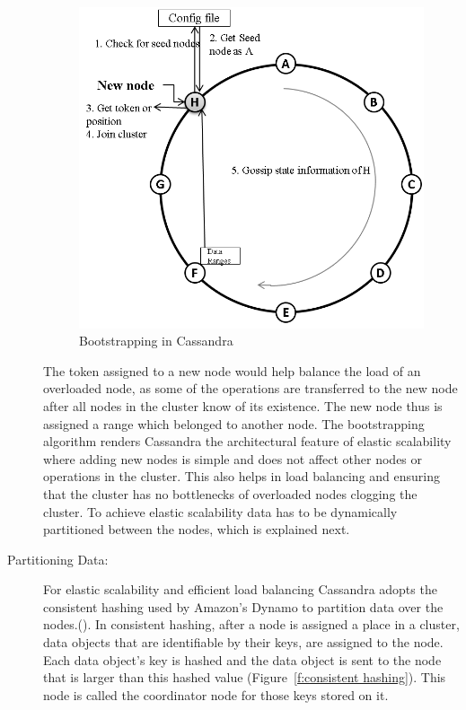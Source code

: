 \begin{description}
\newpage

\begin{figure}[H]
	\centering
	\includegraphics[width=.6\textwidth]{./figure/Solutions/Bootstrapping.png}
	\caption{Bootstrapping in Cassandra}\label{f:bootstrap}
\end{figure}

The token assigned to a new node would help balance the load of an overloaded
node, as some of the operations are transferred to the new node after all nodes
in the cluster know of its existence.  The new node thus is assigned a range
which belonged to another node. The bootstrapping algorithm renders Cassandra
the architectural feature of elastic scalability where adding new nodes is
simple and does not affect other nodes or operations in the cluster. This also helps in load balancing and ensuring that
the cluster has no bottlenecks of overloaded nodes clogging the cluster. To achieve
elastic scalability data has to be dynamically partitioned between the nodes,
which is explained next.

\item[Partitioning Data:] For  elastic scalability and efficient load balancing
Cassandra adopts the consistent hashing used by Amazon's Dynamo to partition
data over the nodes.(). In consistent hashing, after
a node is assigned a place in a cluster, data objects that are identifiable by
their keys, are assigned to the node. Each data object's key is hashed and the
data object is sent
to the node that is larger than this hashed value (Figure~\ref{f:consistent
hashing}). This node is called the coordinator node for those keys stored on it.


\end{description}
